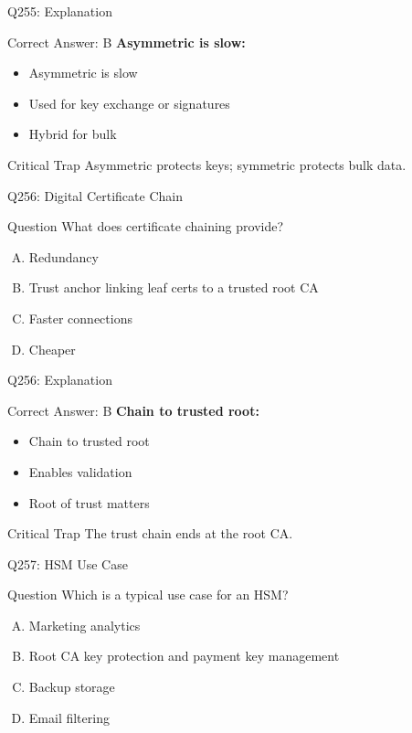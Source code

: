 \documentclass{beamer}
\begin{document}
	\begin{frame}{Q255: Explanation}
		\begin{block}{Correct Answer: B}
			\textbf{Asymmetric is slow:}
			\begin{itemize}
				\item Asymmetric is slow
				\item Used for key exchange or signatures
				\item Hybrid for bulk
			\end{itemize}
		\end{block}
		\begin{alertblock}{Critical Trap}
			Asymmetric protects keys; symmetric protects bulk data.
		\end{alertblock}
	\end{frame}
	
	\begin{frame}{Q256: Digital Certificate Chain}
		\begin{block}{Question}
			What does certificate chaining provide?
		\end{block}
		\begin{enumerate}[(A)]
			\item Redundancy
			\item Trust anchor linking leaf certs to a trusted root CA
			\item Faster connections
			\item Cheaper
		\end{enumerate}
	\end{frame}
	
	\begin{frame}{Q256: Explanation}
		\begin{block}{Correct Answer: B}
			\textbf{Chain to trusted root:}
			\begin{itemize}
				\item Chain to trusted root
				\item Enables validation
				\item Root of trust matters
			\end{itemize}
		\end{block}
		\begin{alertblock}{Critical Trap}
			The trust chain ends at the root CA.
		\end{alertblock}
	\end{frame}
	
	\begin{frame}{Q257: HSM Use Case}
		\begin{block}{Question}
			Which is a typical use case for an HSM?
		\end{block}
		\begin{enumerate}[(A)]
			\item Marketing analytics
			\item Root CA key protection and payment key management
			\item Backup storage
			\item Email filtering
		\end{enumerate}
	\end{frame}
	
\end{document}
